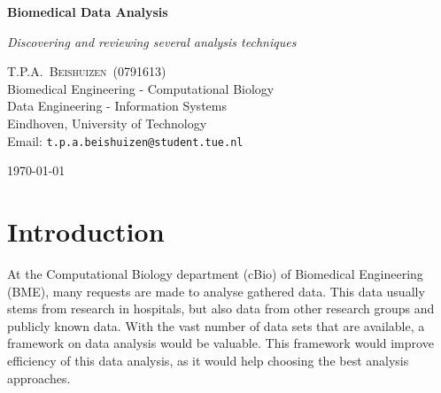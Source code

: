\documentclass[10pt,a4paper]{article}
\newcommand{\documenttitle}{Biomedical Data Analysis }
\newcommand{\documentsubtitle}{Discovering and reviewing several analysis techniques}
\begin{document}
	
	\begin{titlepage}
		
		\center
		
		\vspace*{3cm}
		
		\textbf{\huge \documenttitle}
		
		\textit{\LARGE \documentsubtitle}
		
		\vspace*{2cm}
		
		\large
		\centering
		T.P.A.~\textsc{Beishuizen}~(0791613)\\
		Biomedical Engineering - Computational Biology\\
		Data Engineering - Information Systems\\
		Eindhoven, University of Technology\\
		Email: \texttt{t.p.a.beishuizen@student.tue.nl}
		
		\vfill
		
		\vspace*{1cm}
		
		\today
		
	\end{titlepage}
	
	\tableofcontents
	
	
	\pagestyle{fancy}
	\fancyhead{} %
	\fancyfoot{} %
	\renewcommand{\headrulewidth}{0.4pt}
	\renewcommand{\footrulewidth}{0.4pt}
	
	\fancyhead[L]{\rightmark}
	\fancyfoot[C]{\thepage}
	
	
	\clearpage
	
	\section{Introduction}
	
	At the Computational Biology department (cBio) of Biomedical Engineering (BME), many requests are made to analyse gathered data. This data usually stems from research in hospitals, but also data from other research groups and publicly known data. With the vast number of data sets that are available, a framework on data analysis would be valuable. This framework would improve efficiency of this data analysis, as it would help choosing the best analysis approaches. 
	
\end{document}
